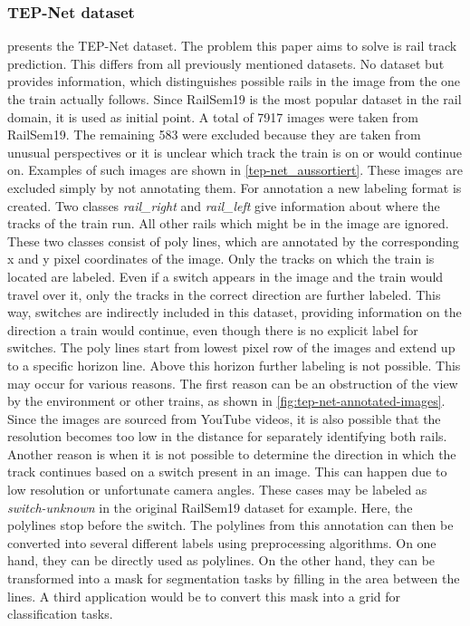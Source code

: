 \subsubsection{TEP-Net dataset}
\cite{tepNet2024} presents the \ac{TEP}-Net dataset.
The problem this paper aims to solve is rail track prediction.
This differs from all previously mentioned datasets.
No dataset but \cite{tepNet2024} provides information, which distinguishes possible rails in the image from the one the train actually follows.
Since RailSem19 is the most popular dataset in the rail domain, it is used as initial point.
A total of 7917 images were taken from RailSem19.
The remaining 583 were excluded because they are taken from unusual perspectives or it is unclear which track the train is on or would continue on.
Examples of such images are shown in \ref{tep-net_aussortiert}.
These images are excluded simply by not annotating them.
For annotation a new labeling format is created.
Two classes \textit{rail\_right} and \textit{rail\_left} give information about where the tracks of the train  run.
All other rails which might be in the image are ignored.
These two classes consist of poly lines, which are annotated by the corresponding x and y pixel coordinates of the image.
Only the tracks on which the train is located are labeled.
Even if a switch appears in the image and the train would travel over it, only the tracks in the correct direction are further labeled.
This way, switches are indirectly included in this dataset, providing information on the direction a train would continue, even though there is no explicit label for switches.
The poly lines start from lowest pixel row of the images and extend up to a specific horizon line.
Above this horizon further labeling is not possible.
This may occur for various reasons.
The first reason can be an obstruction of the view by the environment or other trains, as shown in \ref{fig:tep-net-annotated-images}.
Since the images are sourced from YouTube videos, it is also possible that the resolution becomes too low in the distance for separately identifying both rails.
Another reason is when it is not possible to determine the direction in which the track continues based on a switch present in an image.
This can happen due to low resolution or unfortunate camera angles.
These cases may be labeled as \textit{switch-unknown} in the original RailSem19 dataset for example.
Here, the polylines stop before the switch.
The polylines from this annotation can then be converted into several different labels using preprocessing algorithms.
On one hand, they can be directly used as polylines.
On the other hand, they can be transformed into a mask for segmentation tasks by filling in the area between the lines.
A third application would be to convert this mask into a grid for classification tasks.

